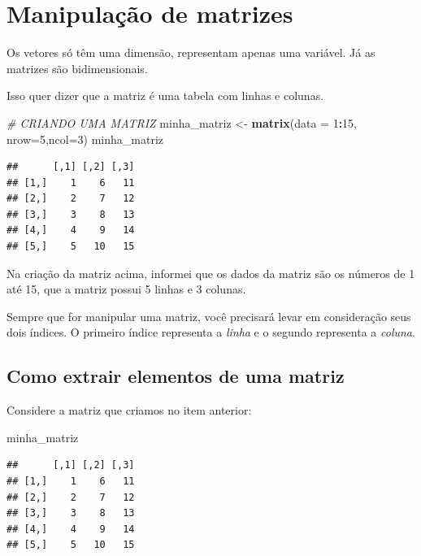 \documentclass[
]{book}
\newenvironment{Shaded}{\begin{snugshade}}{\end{snugshade}}
\newcommand{\CommentTok}[1]{\textcolor[rgb]{0.56,0.35,0.01}{\textit{#1}}}
\newcommand{\DataTypeTok}[1]{\textcolor[rgb]{0.13,0.29,0.53}{#1}}
\newcommand{\DecValTok}[1]{\textcolor[rgb]{0.00,0.00,0.81}{#1}}
\newcommand{\KeywordTok}[1]{\textcolor[rgb]{0.13,0.29,0.53}{\textbf{#1}}}
\newcommand{\NormalTok}[1]{#1}
\newcommand{\OperatorTok}[1]{\textcolor[rgb]{0.81,0.36,0.00}{\textbf{#1}}}
\newcommand{\StringTok}[1]{\textcolor[rgb]{0.31,0.60,0.02}{#1}}
\begin{document}
\hypertarget{manipulauxe7uxe3o-de-matrizes}{%
\section{Manipulação de matrizes}\label{manipulauxe7uxe3o-de-matrizes}}

Os vetores só têm uma dimensão, representam apenas uma variável. Já as
matrizes são bidimensionais.

Isso quer dizer que a matriz é uma tabela com linhas e colunas.

\begin{Shaded}
\begin{Highlighting}[]
\CommentTok{# CRIANDO UMA MATRIZ}
\NormalTok{minha_matriz <-}\StringTok{ }\KeywordTok{matrix}\NormalTok{(}\DataTypeTok{data =} \DecValTok{1}\OperatorTok{:}\DecValTok{15}\NormalTok{, }\DataTypeTok{nrow=}\DecValTok{5}\NormalTok{,}\DataTypeTok{ncol=}\DecValTok{3}\NormalTok{) }
\NormalTok{minha_matriz}
\end{Highlighting}
\end{Shaded}

\begin{verbatim}
##      [,1] [,2] [,3]
## [1,]    1    6   11
## [2,]    2    7   12
## [3,]    3    8   13
## [4,]    4    9   14
## [5,]    5   10   15
\end{verbatim}

Na criação da matriz acima, informei que os dados da matriz são os
números de 1 até 15, que a matriz possui 5 linhas e 3 colunas.

Sempre que for manipular uma matriz, você precisará levar em
consideração seus dois índices. O primeiro índice representa a
\emph{linha} e o segundo representa a \emph{coluna}.

\hypertarget{como-extrair-elementos-de-uma-matriz}{%
\subsection{Como extrair elementos de uma
matriz}\label{como-extrair-elementos-de-uma-matriz}}

Considere a matriz que criamos no item anterior:

\begin{Shaded}
\begin{Highlighting}[]
\NormalTok{minha_matriz}
\end{Highlighting}
\end{Shaded}

\begin{verbatim}
##      [,1] [,2] [,3]
## [1,]    1    6   11
## [2,]    2    7   12
## [3,]    3    8   13
## [4,]    4    9   14
## [5,]    5   10   15
\end{verbatim}
\end{document}
